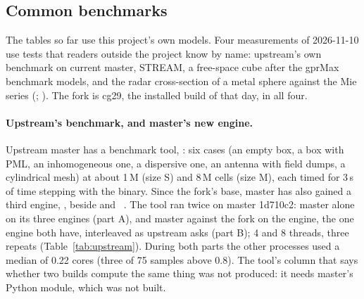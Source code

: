 

\subsection{Common benchmarks}\label{sec:common}
The tables so far use this project's own models. Four measurements of 2026-11-10 use tests that readers outside the
project know by name: upstream's own benchmark on current master, STREAM, a free-space cube after the gprMax benchmark
models, and the radar cross-section of a metal sphere against the Mie series
(; ). The fork is cg29, the installed
build of that day, in all four.

\paragraph{Upstream's benchmark, and master's new engine.}
Upstream master has a benchmark tool, : six cases (an empty box, a box with PML, an
inhomogeneous one, a dispersive one, an antenna with field dumps, a cylindrical mesh) at about 1\,M (size S) and
8\,M cells (size M), each timed for 3\,s of time stepping with the  binary. Since the fork's base,
master has also gained a third engine, , beside  and
~\cite{thliebig495}. The tool ran twice on master 1d710c2: master alone on its three engines (part A), and
master against the fork on the  engine, the one engine both have, interleaved as upstream asks
(part B); 4 and 8 threads, three repeats (Table~\ref{tab:upstream}). During both parts the other processes used a
median of 0.22 cores (three of 75 samples above 0.8). The tool's column that says whether two builds compute the same
thing was not produced: it needs master's Python module, which was not built.

